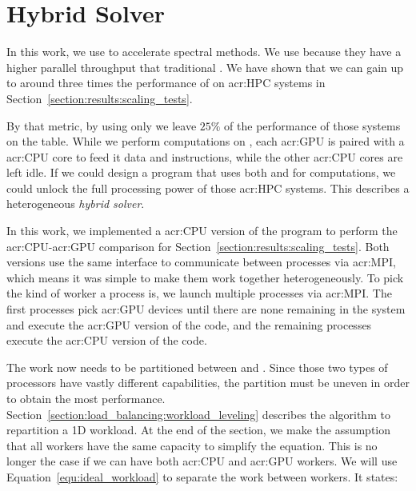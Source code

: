 \chapter{Hybrid Solver}\label{chapter:hybrid_solver}

In this work, we use  to accelerate spectral methods. We use
 because they have a higher parallel throughput that traditional
. We have shown that we can gain up to around three times the performance of
 on \acrshort{acr:HPC} systems in Section~\ref{section:results:scaling_tests}.

By that metric, by using only  we leave \(25 \% \) of the performance of those
systems on the table. While we perform computations on , each \acrshort{acr:GPU}
is paired with a \acrshort{acr:CPU} core to feed it data and instructions, while the other
\acrshort{acr:CPU} cores are left idle. If we could design a program that uses both
 and  for computations, we could unlock the full processing
power of those \acrshort{acr:HPC} systems. This describes a heterogeneous \textit{hybrid solver}.

In this work, we implemented a \acrshort{acr:CPU} version of the program to perform the
\acrshort{acr:CPU}-\acrshort{acr:GPU} comparison for Section~\ref{section:results:scaling_tests}.
Both versions use the same interface to communicate between processes via \acrshort{acr:MPI}, which
means it was simple to make them work together heterogeneously. To pick the kind of worker a process
is, we launch multiple processes via \acrshort{acr:MPI}. The first processes pick \acrshort{acr:GPU}
devices until there are none remaining in the system and execute the \acrshort{acr:GPU} version of
the code, and the remaining processes execute the \acrshort{acr:CPU} version of the code.

The work now needs to be partitioned between  and . Since
those two types of processors have vastly different capabilities, the partition must be uneven in
order to obtain the most performance. Section~\ref{section:load_balancing:workload_leveling}
describes the algorithm to repartition a 1D workload. At the end of the section, we make the
assumption that all workers have the same capacity to simplify the equation. This is no longer the
case if we can have both \acrshort{acr:CPU} and \acrshort{acr:GPU} workers. We will use
Equation~\ref{equ:ideal_workload} to separate the work between workers. It states:


